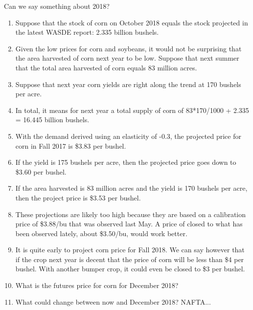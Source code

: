 \documentclass[table,xcolor=pdftex,dvipsnames, handout]{beamer}\usepackage[]{graphicx}\usepackage[]{color}
\begin{document}
\begin{frame}[allowframebreaks]{Can we say something about 2018?}
\begin{enumerate}[label=\textbullet]
  \item Suppose that the stock of corn on October 2018 equals the stock projected in the latest WASDE report: 2.335 billion bushels.
  \item Given the low prices for corn and soybeans, it would not be surprising that the area harvested of corn next year to be low. Suppose that next summer that the total area harvested of corn equals 83 million acres.
  \item Suppose that next year corn yields are right along the trend at 170 bushels per acre.
  \item In total, it means for next year a total supply of corn of 83*170/1000 + 2.335 = 16.445 billion bushels.
  \item With the demand derived using an elasticity of -0.3, the projected price for corn in Fall 2017 is \$3.83 per bushel.
  \item If the yield is 175 bushels per acre, then the projected price goes down to \$3.60 per bushel.
  \item If the area harvested is 83 million acres and the yield is 170 bushels per acre, then the project price is \$3.53 per bushel.
  \item These projections are likely too high because they are based on a calibration price of \$3.88/bu that was observed last May. A price of closed to what has been observed lately, about \$3.50/bu, would work better.
  \item It is quite early to project corn price for Fall 2018. We can say however that if the crop next year is decent that the price of corn will be less than \$4 per bushel. With another bumper crop, it could even be closed to \$3 per bushel.
  \item What is the futures price for corn for December 2018?
  \item What could change between now and December 2018? NAFTA...
\end{enumerate}
\end{frame}


\end{document}
